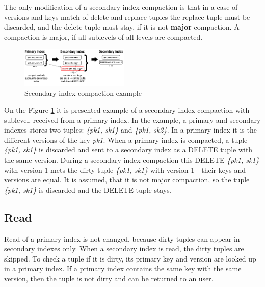 \documentclass{vldb}
\begin{document}
The only modification of a secondary index compaction is that in a case of
versions and keys match of delete and replace tuples the replace tuple must be
discarded, and the delete tuple must stay, if it is not \textbf{major}
compaction. A compaction is major, if all sublevels of all levels are compacted.
\begin{figure}
\centering
\includegraphics[width=0.46\textwidth]{secondary_compaction_example}
\caption{Secondary index compaction example}
\label{fig:secondary_compaction_example}
\end{figure}
On the Figure \ref{fig:secondary_compaction_example} it is presented example of
a secondary index compaction with sublevel, received from a primary index.
In the example, a primary and secondary indexes stores two tuples:
\textit{\{pk1, sk1\}} and \textit{\{pk1, sk2\}}. In a primary index it is the
different versions of the key \textit{pk1}. When a primary index is compacted,
a tuple \textit{\{pk1, sk1\}} is discarded and sent to a secondary index as a
DELETE tuple with the same version. During a secondary index compaction this
DELETE \textit{\{pk1, sk1\}} with version 1 mets the dirty tuple
\textit{\{pk1, sk1\}} with version 1 - their keys and versions are equal. It is
assumed, that it is not major compaction, so the tuple \textit{\{pk1, sk1\}} is
discarded and the DELETE tuple stays.

\subsection{Read}

Read of a primary index is not changed, because dirty tuples can appear in
secondary indexes only. When a secondary index is read, the dirty tuples are
skipped. To check a tuple if it is dirty, its primary key and version are looked
up in a primary index. If a primary index contains the same key with the same
version, then the tuple is not dirty and can be returned to an user.
\end{document}
